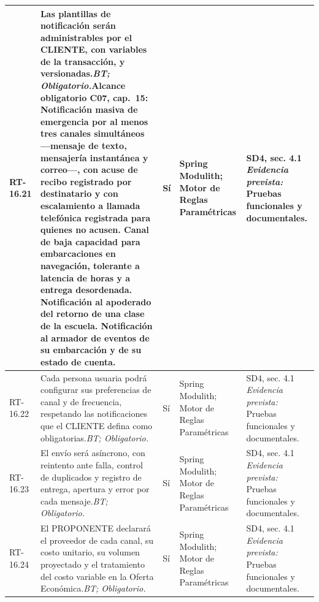 \begin{paginaHorizontalSynaptix}
\begin{longtable}{|L{0.09\AnchoMatrizTDoce}|L{0.385\AnchoMatrizTDoce}|L{0.065\AnchoMatrizTDoce}|L{0.18\AnchoMatrizTDoce}|L{0.28\AnchoMatrizTDoce}|}
RT-\allowbreak{}16.\allowbreak{}21 &
Las plantillas de notificación serán administrables por el CLIENTE, con variables de la transacción, y versionadas.\newline\textit{BT; Obligatorio.}\newline\textbf{Alcance obligatorio C07, cap.~15:} Notificación masiva de emergencia por al menos tres canales simultáneos —mensaje de texto, mensajería instantánea y correo—, con acuse de recibo registrado por destinatario y con escalamiento a llamada telefónica registrada para quienes no acusen. Canal de baja capacidad para embarcaciones en navegación, tolerante a latencia de horas y a entrega desordenada. Notificación al apoderado del retorno de una clase de la escuela. Notificación al armador de eventos de su embarcación y de su estado de cuenta. &
Sí &
Spring Modulith; Motor de Reglas Paramétricas &
SD4, sec. 4.1 \newline\textit{Evidencia prevista:} Pruebas funcionales y documentales. \\ \hline

RT-\allowbreak{}16.\allowbreak{}22 &
Cada persona usuaria podrá configurar sus preferencias de canal y de frecuencia, respetando las notificaciones que el CLIENTE defina como obligatorias.\newline\textit{BT; Obligatorio.} &
Sí &
Spring Modulith; Motor de Reglas Paramétricas &
SD4, sec. 4.1 \newline\textit{Evidencia prevista:} Pruebas funcionales y documentales. \\ \hline

RT-\allowbreak{}16.\allowbreak{}23 &
El envío será asíncrono, con reintento ante falla, control de duplicados y registro de entrega, apertura y error por cada mensaje.\newline\textit{BT; Obligatorio.} &
Sí &
Spring Modulith; Motor de Reglas Paramétricas &
SD4, sec. 4.1 \newline\textit{Evidencia prevista:} Pruebas funcionales y documentales. \\ \hline

RT-\allowbreak{}16.\allowbreak{}24 &
El PROPONENTE declarará el proveedor de cada canal, su costo unitario, su volumen proyectado y el tratamiento del costo variable en la Oferta Económica.\newline\textit{BT; Obligatorio.} &
Sí &
Spring Modulith; Motor de Reglas Paramétricas &
SD4, sec. 4.1 \newline\textit{Evidencia prevista:} Pruebas funcionales y documentales. \\ \hline


\end{longtable}
\end{paginaHorizontalSynaptix}

